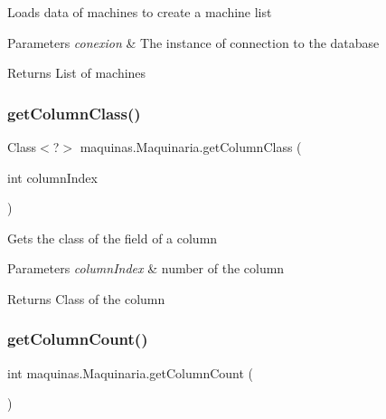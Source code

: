 Loads data of machines to create a machine list 
\begin{DoxyParams}{Parameters}
{\em conexion} & The instance of connection to the database \\
\hline
\end{DoxyParams}
\begin{DoxyReturn}{Returns}
List of machines 
\end{DoxyReturn}
\mbox{\label{classmaquinas_1_1_maquinaria_ae792351e004fa5f3d10900e33f10186d}} 
\subsubsection{\texorpdfstring{get\+Column\+Class()}{getColumnClass()}}
{\footnotesize\ttfamily Class$<$?$>$ maquinas.\+Maquinaria.\+get\+Column\+Class (\begin{DoxyParamCaption}\item[{int}]{column\+Index }\end{DoxyParamCaption})\hspace{0.3cm}{\ttfamily [inline]}}

Gets the class of the field of a column 
\begin{DoxyParams}{Parameters}
{\em column\+Index} & number of the column \\
\hline
\end{DoxyParams}
\begin{DoxyReturn}{Returns}
Class of the column 
\end{DoxyReturn}
\mbox{\label{classmaquinas_1_1_maquinaria_a4d573c7762633b39ef7305ecb1b6ffa3}} 
\subsubsection{\texorpdfstring{get\+Column\+Count()}{getColumnCount()}}
{\footnotesize\ttfamily int maquinas.\+Maquinaria.\+get\+Column\+Count (\begin{DoxyParamCaption}{ }\end{DoxyParamCaption})\hspace{0.3cm}{\ttfamily [inline]}}

